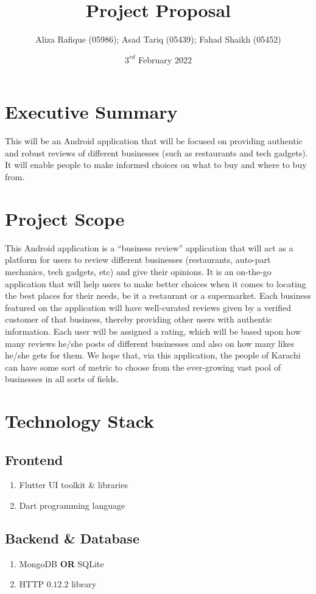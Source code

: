\documentclass[11pt]{extarticle}
\title{\textbf{Project Proposal}}
\author{Aliza Rafique (05986); Asad Tariq (05439); Fahad Shaikh (05452)}
\date{$3^{rd}$ February 2022}
\begin{document}

\newpage
\thispagestyle{empty}
\tableofcontents
\newpage
\pagestyle{plain}

\section{Executive Summary}
\noindent
This will be an Android application that will be focused on providing authentic and robust reviews of different businesses (such as restaurants and tech gadgets). It will enable people to make informed choices on what to buy and where to buy from.

\section{Project Scope}
\noindent
This Android application is a “business review” application that will act as a platform for users to review different businesses (restaurants, auto-part mechanics, tech gadgets, etc) and give their opinions. It is an on-the-go application that will help users to make better choices when it comes to locating the best places for their needs, be it a restaurant or a supermarket. Each business featured on the application will have well-curated reviews given by a verified customer of that business, thereby providing other users with authentic information. Each user will be assigned a rating, which will be based upon how many reviews he/she posts of different businesses and also on how many likes he/she gets for them. We hope that, via this application, the people of Karachi can have some sort of metric to choose from the ever-growing vast pool of businesses in all sorts of fields.

\section{Technology Stack}
\subsection{Frontend}
\begin{enumerate}[label={\alph*.}]
    \item Flutter UI toolkit \& libraries
    \item Dart programming language
\end{enumerate}

\subsection{Backend \& Database}
\begin{enumerate}[label={\alph*.}]
    \item MongoDB \textbf{OR} SQLite
    \item HTTP $0.12.2$ library
\end{enumerate}
\end{document}
